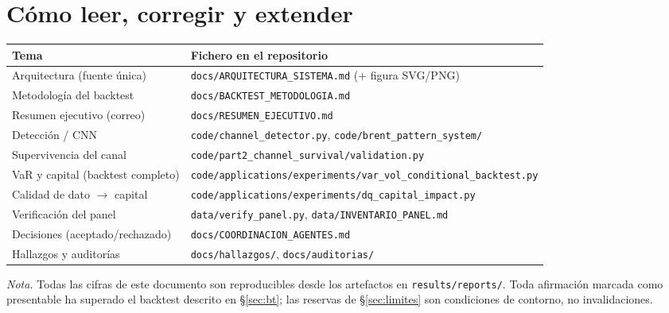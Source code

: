 \documentclass[11pt,a4paper]{article}
\begin{document}
\section{Cómo leer, corregir y extender}
\noindent\footnotesize
\begin{tabularx}{\linewidth}{l L}
\toprule
Tema & Fichero en el repositorio\\
\midrule
Arquitectura (fuente única) & \texttt{docs/ARQUITECTURA\_SISTEMA.md} (+ figura SVG/PNG)\\
Metodología del backtest & \texttt{docs/BACKTEST\_METODOLOGIA.md}\\
Resumen ejecutivo (correo) & \texttt{docs/RESUMEN\_EJECUTIVO.md}\\
Detección / CNN & \texttt{code/channel\_detector.py}, \texttt{code/brent\_pattern\_system/}\\
Supervivencia del canal & \texttt{code/part2\_channel\_survival/validation.py}\\
VaR y capital (backtest completo) & \texttt{code/applications/experiments/var\_vol\_conditional\_backtest.py}\\
Calidad de dato $\to$ capital & \texttt{code/applications/experiments/dq\_capital\_impact.py}\\
Verificación del panel & \texttt{data/verify\_panel.py}, \texttt{data/INVENTARIO\_PANEL.md}\\
Decisiones (aceptado/rechazado) & \texttt{docs/COORDINACION\_AGENTES.md}\\
Hallazgos y auditorías & \texttt{docs/hallazgos/}, \texttt{docs/auditorias/}\\
\bottomrule
\end{tabularx}
\normalsize

\vspace{2mm}\noindent\emph{Nota.} Todas las cifras de este documento son
reproducibles desde los artefactos en \texttt{results/reports/}. Toda afirmación
marcada como presentable ha superado el backtest descrito en §\ref{sec:bt}; las
reservas de §\ref{sec:limites} son condiciones de contorno, no invalidaciones.
\end{document}
